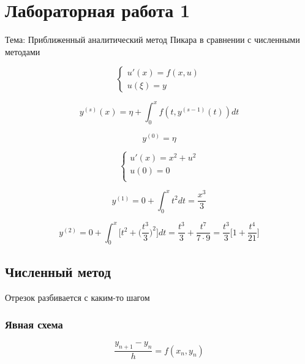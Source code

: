 \section{Лабораторная работа 1}

Тема: Приближенный аналитический метод Пикара в сравнении с численными
методами

\begin{equation*}
    \begin{cases}
        u'(x) = f(x,u) \\
        u(\xi) = y
    \end{cases}
\end{equation*}

\begin{equation*}
    y^{(s)}(x) = \eta + \int_0^x f(t, y^{(s-1)}(t)) dt
\end{equation*}

\begin{equation*}
    y^{(0)} = \eta
\end{equation*}

\begin{equation*}
    \begin{cases}
        u'(x) = x^2 + u^2 \\
        u(0) = 0 \\
    \end{cases}
\end{equation*}

\begin{equation*}
    y^{(1)} = 0 + \int_0^x t^2 dt = \frac{x^3}{3}
\end{equation*}

\begin{equation*}
    y^{(2)} = 0 + \int_0^x \bigg[ t^2 + \big( \frac{t^3}{3} \big)^2 \bigg] dt = \frac{t^3}{3} + \frac{t^7}{7 \cdot 9} = \frac{t^3}{3} \bigg[1 + \frac{t^4}{21} \bigg]
\end{equation*}

\subsection{Численный метод}

Отрезок разбивается с каким-то шагом

\subsubsection{Явная схема}

\begin{equation*}
    \frac{y_{n+1} - y_n}{h} = f(x_n, y_n)
\end{equation*}

